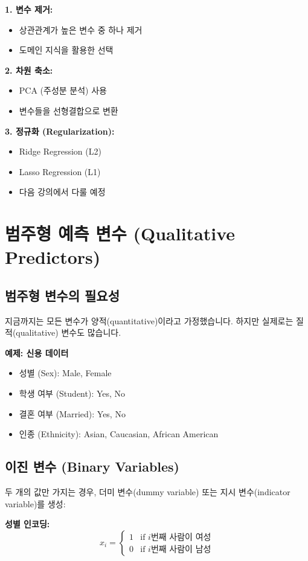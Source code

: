 \documentclass[12pt]{article}
\begin{document}
\textbf{1. 변수 제거:}
\begin{itemize}
    \item 상관관계가 높은 변수 중 하나 제거
    \item 도메인 지식을 활용한 선택
\end{itemize}

\textbf{2. 차원 축소:}
\begin{itemize}
    \item PCA (주성분 분석) 사용
    \item 변수들을 선형결합으로 변환
\end{itemize}

\textbf{3. 정규화 (Regularization):}
\begin{itemize}
    \item Ridge Regression (L2)
    \item Lasso Regression (L1)
    \item 다음 강의에서 다룰 예정
\end{itemize}

\section{범주형 예측 변수 (Qualitative Predictors)}

\subsection{범주형 변수의 필요성}

지금까지는 모든 변수가 양적(quantitative)이라고 가정했습니다. 하지만 실제로는 질적(qualitative) 변수도 많습니다.

\textbf{예제: 신용 데이터}
\begin{itemize}
    \item 성별 (Sex): Male, Female
    \item 학생 여부 (Student): Yes, No
    \item 결혼 여부 (Married): Yes, No
    \item 인종 (Ethnicity): Asian, Caucasian, African American
\end{itemize}

\subsection{이진 변수 (Binary Variables)}

두 개의 값만 가지는 경우, 더미 변수(dummy variable) 또는 지시 변수(indicator variable)를 생성:

\textbf{성별 인코딩:}
\begin{equation}
x_i = \begin{cases}
1 & \text{if } i\text{번째 사람이 여성} \\
0 & \text{if } i\text{번째 사람이 남성}
\end{cases}
\end{equation}
\end{document}
